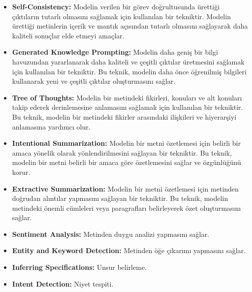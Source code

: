 \begin{itemize}
    \item \textbf{Self-Consistency:} Modelin verilen bir görev doğrultusunda ürettiği çıktıların tutarlı olmasını sağlamak için kullanılan bir tekniktir. Modelin ürettiği metinlerin içerik ve mantık açısından tutarlı olmasını sağlayarak daha kaliteli sonuçlar elde etmeyi amaçlar.
    \item \textbf{Generated Knowledge Prompting:} Modelin daha geniş bir bilgi havuzundan yararlanarak daha kaliteli ve çeşitli çıktılar üretmesini sağlamak için kullanılan bir  tekniktir. Bu teknik, modelin daha önce öğrenilmiş bilgileri kullanarak yeni ve çeşitli çıktılar oluşturmasını sağlar.
    \item \textbf{Tree of Thoughts:} Modelin bir metindeki fikirleri, konuları ve alt konuları takip ederek derinlemesine anlamasını sağlamak için kullanılan bir tekniktir. Bu teknik, modelin bir metindeki fikirler arasındaki ilişkileri ve hiyerarşiyi anlamasına yardımcı olur.
    \item \textbf{Intentional Summarization:} Modelin bir metni özetlemesi için belirli bir amaca yönelik olarak yönlendirilmesini sağlayan bir tekniktir. Bu teknik, modelin bir metni belirli bir amaca göre özetlemesini sağlar ve özgünlüğünü korur.
    \item \textbf{Extractive Summarization:} Modelin bir metni özetlemesi için metinden doğrudan alıntılar yapmasını sağlayan bir tekniktir. Bu teknik, modelin metindeki önemli cümleleri veya paragrafları belirleyerek özet oluşturmasını sağlar.
    \item \textbf{Sentiment Analysis:} Metinden duygu analizi yapmasını sağlar.
    \item \textbf{Entity and Keyword Detection:} Metinden öğe çıkarımı yapmasını sağlar.
    \item \textbf{Inferring Specifications:} Unsur belirleme.
    \item \textbf{Intent Detection:} Niyet tespiti.
\end{itemize}


